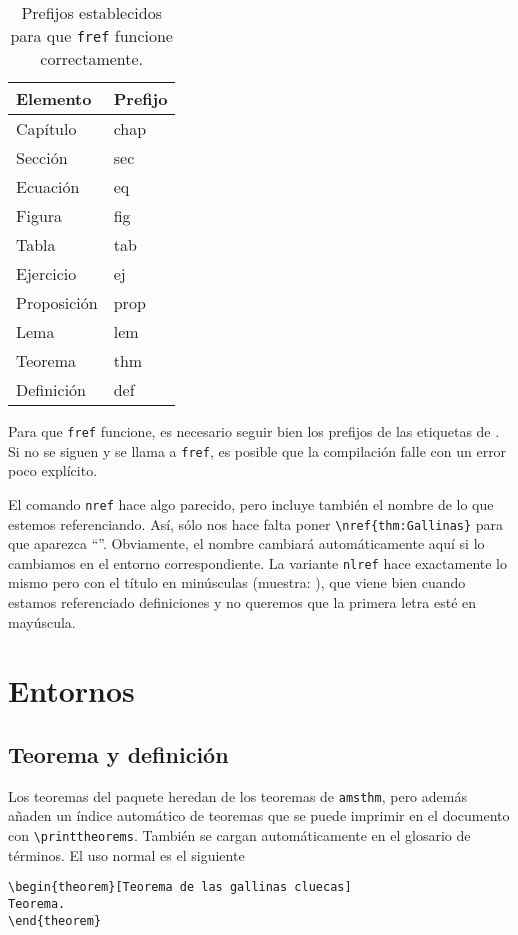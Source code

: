 \documentclass[nochap]{apuntes}
\begin{document}
\begin{table}[hbtp]
\centering
\begin{tabular}{l|l}
Elemento & Prefijo \\ \hline
Capítulo & chap \\
Sección & sec \\
Ecuación & eq \\
Figura & fig \\
Tabla & tab \\
Ejercicio & ej \\
Proposición & prop \\
Lema & lem \\
Teorema & thm \\
Definición & def
\end{tabular}
\caption{Prefijos establecidos para que \texttt{fref} funcione correctamente.}
\label{tab:PrefjosFref}
\end{table}


Para que \texttt{fref} funcione, es necesario seguir bien los prefijos de las etiquetas de . Si no se siguen y se llama a \texttt{fref}, es posible que la compilación falle con un error poco explícito.

El comando \texttt{nref} hace algo parecido, pero incluye también el nombre de lo que estemos referenciando. Así, sólo nos hace falta poner \verb|\nref{thm:Gallinas}| para que aparezca ``''. Obviamente, el nombre cambiará automáticamente aquí si lo cambiamos en el entorno correspondiente. La variante \texttt{nlref} hace exactamente lo mismo pero con el título en minúsculas (muestra: ), que viene bien cuando estamos referenciado definiciones y no queremos que la primera letra esté en mayúscula.

\section{Entornos}
\subsection{Teorema y definición}

Los teoremas del paquete heredan de los teoremas de \texttt{amsthm}, pero además añaden un índice automático de teoremas que se puede imprimir en el documento con \verb|\printtheorems|. También se cargan automáticamente en el glosario de términos. El uso normal es el siguiente

\begin{verbatim}
\begin{theorem}[Teorema de las gallinas cluecas]
Teorema.
\end{theorem}
\end{verbatim}
\end{document}
